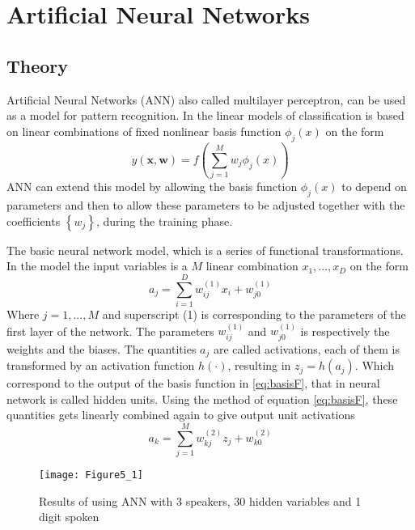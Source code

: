 \chapter{Artificial Neural Networks}

\section{Theory}
Artificial Neural Networks (ANN) also called multilayer perceptron, can be used as a model for pattern recognition. 
In the linear models of classification is based on linear combinations of fixed nonlinear basis function $ \phi_j(x)$ on the form
\begin{equation}
y(\mathbf{x},\mathbf{w}) = f\left( \sum_{j=1}^{M}w_j \phi_j(x) \right)
\label{eq:basisF} 
\end{equation}
ANN can extend this model by allowing the basis function $ \phi_j(x)$ to depend on parameters and then to allow these parameters to be adjusted together with the coefficients $ \left\lbrace w_j \right\rbrace $, during the training phase.

The basic neural network model, which is a series of functional transformations. 
In the model the input variables is a $ M $ linear combination $ x_1,...,x_D $ on the form
\begin{equation}
a_j = \sum_{i=1}^{D} w_{ij}^{(1)}x_i+w_{j0}^{(1)}
\end{equation}
Where $ j=1,...,M $ and superscript (1) is corresponding to the parameters of the first layer of the network.
The parameters $ w_{ij}^{(1)}$ and $w_{j0}^{(1)} $ is respectively the weights and the biases. 
The quantities $ a_j $ are called activations, each of them is transformed by an activation function $ h(\cdotp) $, resulting in $ z_j = h(a_j) $.
Which correspond to the output of the basis function in \ref{eq:basisF}, that in neural network is called hidden units. Using the method of equation \ref{eq:basisF}, these quantities gets linearly combined again to give output unit activations  
\begin{equation}
a_k = \sum_{j=1}^{M} w_{kj}^{(2)}z_j+w_{k0}^{(2)}
\end{equation}


   
\begin{figure}[H]
\centering
\texttt{[image: Figure5\_1]}
\caption{Results of using ANN with 3 speakers, 30 hidden variables and 1 digit spoken}
\label{fig:ANN_fig_theory}
\end{figure}

